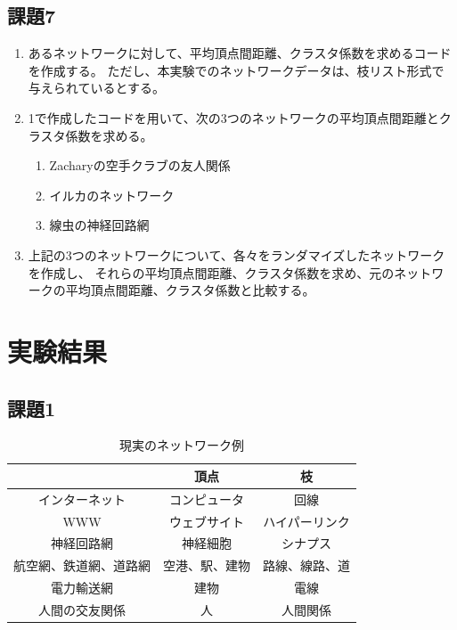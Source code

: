 \documentclass[12pt]{jarticle}
\begin{document}
\subsection{課題7}
\begin{enumerate}
    \item あるネットワークに対して、平均頂点間距離、クラスタ係数を求めるコードを作成する。
          ただし、本実験でのネットワークデータは、枝リスト形式で与えられているとする。
    \item 1で作成したコードを用いて、次の3つのネットワークの平均頂点間距離とクラスタ係数を求める。
          \begin{enumerate}
              \item Zacharyの空手クラブの友人関係
              \item イルカのネットワーク
              \item 線虫の神経回路網
          \end{enumerate}
    \item 上記の3つのネットワークについて、各々をランダマイズしたネットワークを作成し、
          それらの平均頂点間距離、クラスタ係数を求め、元のネットワークの平均頂点間距離、クラスタ係数と比較する。
\end{enumerate}

\section{実験結果}
\subsection{課題1}
\begin{table}[htb]
    \caption{現実のネットワーク例}
    \begin{center}
        \begin{tabular}{|c||c|c|}
            \hline
                                   & 頂点           & 枝             \\ \hline \hline
            インターネット         & コンピュータ   & 回線           \\ \hline
            WWW                    & ウェブサイト   & ハイパーリンク \\ \hline
            神経回路網             & 神経細胞       & シナプス       \\ \hline
            航空網、鉄道網、道路網 & 空港、駅、建物 & 路線、線路、道 \\ \hline
            電力輸送網             & 建物           & 電線           \\ \hline
            人間の交友関係         & 人             & 人間関係       \\ \hline
        \end{tabular}
    \end{center}
\end{table}
\end{document}
